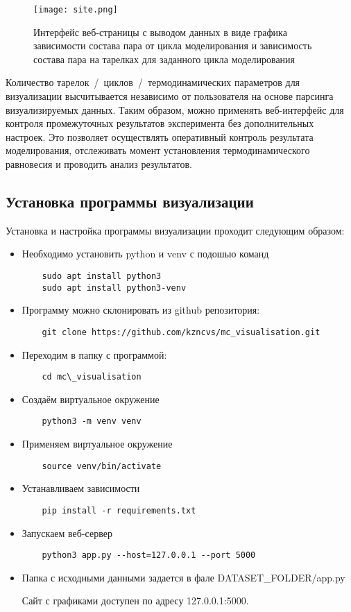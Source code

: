 \begin{figure}
	\begin{center}
		\texttt{[image: site.png]}
	\end{center}
	\caption{Интерфейс веб-страницы с выводом данных в виде графика зависимости состава пара от цикла моделирования и зависимость состава пара на тарелках для заданного цикла моделирования} \label{fig:site}
\end{figure}

Количество тарелок / циклов / термодинамических параметров для визуализации высчитывается независимо от пользователя на основе парсинга визуализируемых данных. Таким образом, можно применять веб-интерфейс для контроля промежуточных результатов эксперимента без дополнительных настроек. Это позволяет осуществлять оперативный контроль результата моделирования, отслеживать момент установления термодинамического равновесия и проводить анализ результатов.

\subsection{Установка программы визуализации}

Установка и настройка программы визуализации проходит следующим образом:
\begin{itemize}
	\item Необходимо установить python и venv с подошью команд
	\begin{lstlisting}
	sudo apt install python3
	sudo apt install python3-venv
	\end{lstlisting}
	\item Программу можно склонировать из github репозитория:
	\begin{lstlisting}
	git clone https://github.com/kzncvs/mc_visualisation.git
	\end{lstlisting}
	\item Переходим в папку с программой:
	\begin{lstlisting}
	cd mc\_visualisation
	\end{lstlisting}
	\item Создаём виртуальное окружение
	\begin{lstlisting}
	python3 -m venv venv
	\end{lstlisting}
	\item Применяем виртуальное окружение
	\begin{lstlisting}
	source venv/bin/activate
	\end{lstlisting}
	\item Устанавливаем зависимости
	\begin{lstlisting}
	pip install -r requirements.txt
	\end{lstlisting}
	\item  Запускаем веб-сервер
	\begin{lstlisting}
	python3 app.py --host=127.0.0.1 --port 5000
	\end{lstlisting}
	\item Папка с исходными данными задается в фале  DATASET\_FOLDER/app.py
	
	
	Сайт с графиками доступен по адресу 127.0.0.1:5000.
	
\end{itemize}


